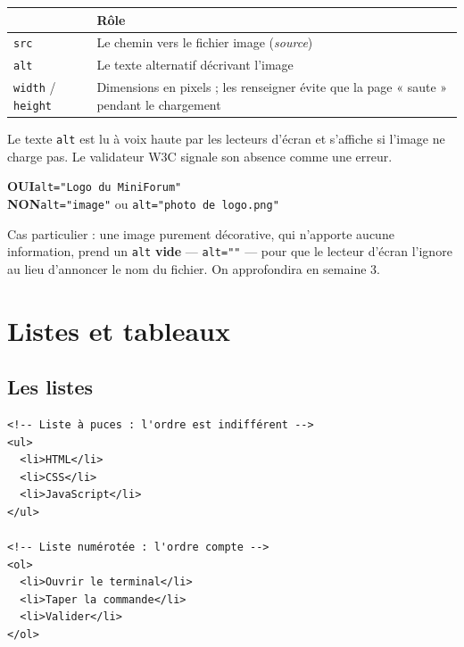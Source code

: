 \documentclass[a4paper,11pt]{article}
\newcommand{\hdr}[1]{\multicolumn{1}{l}{\color{white}\bfseries #1}}
\renewcommand{\arraystretch}{1.3}
\begin{document}
\begin{center}
\renewcommand{\arraystretch}{1.0}
\begin{tabularx}{\linewidth}{p{2.6cm}X}
  \toprule
  \rowcolor{uniNavy}
  \hdr{Attribut} & \hdr{Rôle} \\
  \midrule
  \rowcolor{uniPaper}
  \texttt{src} & Le chemin vers le fichier image (\textit{source}) \\
  \texttt{alt} & Le texte alternatif décrivant l'image \\
  \rowcolor{uniPaper}
  \texttt{width} / \texttt{height} & Dimensions en pixels ; les renseigner évite que la page « saute » pendant le chargement \\
  \bottomrule
\end{tabularx}
\end{center}

\begin{tcolorbox}[attention, title={L'attribut \texttt{alt} n'est pas optionnel}]
Le texte \texttt{alt} est lu à voix haute par les lecteurs d'écran et s'affiche si l'image ne charge pas. Le validateur W3C signale son absence comme une erreur.

\vspace{4pt}
\textcolor{successGreen}{\textbf{OUI}}\quad \texttt{alt="Logo du MiniForum"}\\[3pt]
\textcolor{alertRed}{\textbf{NON}}\quad \texttt{alt="image"} \quad ou \quad \texttt{alt="photo de logo.png"}

\vspace{4pt}
Cas particulier : une image purement décorative, qui n'apporte aucune information, prend un \texttt{alt} \textbf{vide} --- \texttt{alt=""} --- pour que le lecteur d'écran l'ignore au lieu d'annoncer le nom du fichier. On approfondira en semaine 3.
\end{tcolorbox}

\section{Listes et tableaux}

\subsection{Les listes}

\begin{lstlisting}[language=HTML5, caption={Liste non ordonnée et liste ordonnée}]
<!-- Liste à puces : l'ordre est indifférent -->
<ul>
  <li>HTML</li>
  <li>CSS</li>
  <li>JavaScript</li>
</ul>

<!-- Liste numérotée : l'ordre compte -->
<ol>
  <li>Ouvrir le terminal</li>
  <li>Taper la commande</li>
  <li>Valider</li>
</ol>
\end{lstlisting}
\end{document}
